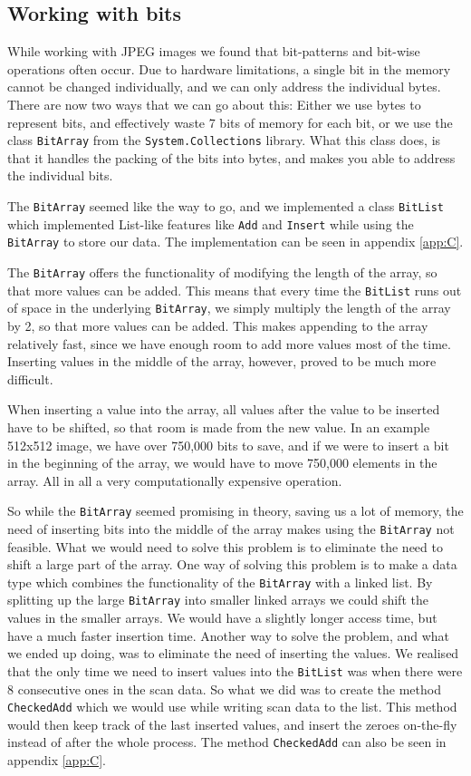 \subsection{Working with bits}
While working with JPEG images we found that bit-patterns and bit-wise operations often occur.
Due to hardware limitations, a single bit in the memory cannot be changed individually, and we can only address the individual bytes.
There are now two ways that we can go about this:
Either we use bytes to represent bits, and effectively waste 7 bits of memory for each bit, or we use the class \lstinline|BitArray| from the \lstinline|System.Collections| library.
What this class does, is that it handles the packing of the bits into bytes, and makes you able to address the individual bits.

The \lstinline|BitArray| seemed like the way to go, and we implemented a class \lstinline|BitList| which implemented List-like features like \lstinline|Add| and \lstinline|Insert| while using the \lstinline|BitArray| to store our data.
The implementation can be seen in appendix \ref{app:C}. 

The \lstinline|BitArray| offers the functionality of modifying the length of the array, so that more values can be added.
This means that every time the \lstinline|BitList| runs out of space in the underlying \lstinline|BitArray|, we simply multiply the length of the array by 2, so that more values can be added.
This makes appending to the array relatively fast, since we have enough room to add more values most of the time.
Inserting values in the middle of the array, however, proved to be much more difficult.

When inserting a value into the array, all values after the value to be inserted have to be shifted, so that room is made from the new value.
In an example 512x512 image, we have over 750,000 bits to save, and if we were to insert a bit in the beginning of the array, we would have to move 750,000 elements in the array.
All in all a very computationally expensive operation.

So while the \lstinline|BitArray| seemed promising in theory, saving us a lot of memory, the need of inserting bits into the middle of the array makes using the \lstinline|BitArray| not feasible.
What we would need to solve this problem is to eliminate the need to shift a large part of the array. 
One way of solving this problem is to make a data type which combines the functionality of the \lstinline|BitArray| with a linked list. 
By splitting up the large \lstinline|BitArray| into smaller linked arrays we could shift the values in the smaller arrays. 
We would have a slightly longer access time, but have a much faster insertion time. 
Another way to solve the problem, and what we ended up doing, was to eliminate the need of inserting the values. 
We realised that the only time we need to insert values into the \lstinline|BitList| was when there were 8 consecutive ones in the scan data. 
So what we did was to create the method \lstinline|CheckedAdd| which we would use while writing scan data to the list. 
This method would then keep track of the last inserted values, and insert the zeroes on-the-fly instead of after the whole process. 
The method \lstinline|CheckedAdd| can also be seen in appendix \ref{app:C}.